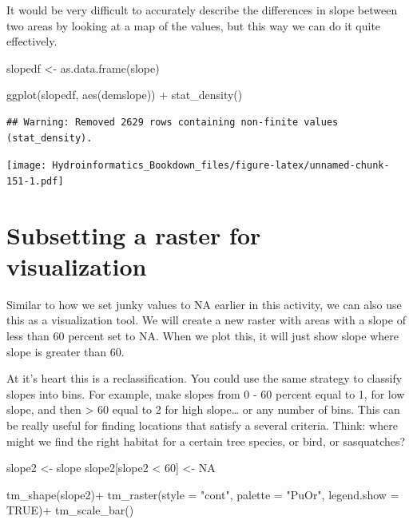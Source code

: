 \documentclass[
]{book}
\newenvironment{Shaded}{\begin{snugshade}}{\end{snugshade}}
\newcommand{\AttributeTok}[1]{\textcolor[rgb]{0.77,0.63,0.00}{#1}}
\newcommand{\ConstantTok}[1]{\textcolor[rgb]{0.00,0.00,0.00}{#1}}
\newcommand{\DecValTok}[1]{\textcolor[rgb]{0.00,0.00,0.81}{#1}}
\newcommand{\FunctionTok}[1]{\textcolor[rgb]{0.00,0.00,0.00}{#1}}
\newcommand{\NormalTok}[1]{#1}
\newcommand{\OtherTok}[1]{\textcolor[rgb]{0.56,0.35,0.01}{#1}}
\newcommand{\SpecialCharTok}[1]{\textcolor[rgb]{0.00,0.00,0.00}{#1}}
\newcommand{\StringTok}[1]{\textcolor[rgb]{0.31,0.60,0.02}{#1}}
\begin{document}
It would be very difficult to accurately describe the differences in slope between two areas by looking at a map of the values, but this way we can do it quite effectively.

\begin{Shaded}
\begin{Highlighting}[]
\NormalTok{slopedf }\OtherTok{\textless{}{-}} \FunctionTok{as.data.frame}\NormalTok{(slope)}

\FunctionTok{ggplot}\NormalTok{(slopedf, }\FunctionTok{aes}\NormalTok{(demslope)) }\SpecialCharTok{+}
  \FunctionTok{stat\_density}\NormalTok{()}
\end{Highlighting}
\end{Shaded}

\begin{verbatim}
## Warning: Removed 2629 rows containing non-finite values (stat_density).
\end{verbatim}

\texttt{[image: Hydroinformatics\_Bookdown\_files/figure-latex/unnamed-chunk-151-1.pdf]}

\hypertarget{subsetting-a-raster-for-visualization}{%
\section{Subsetting a raster for visualization}\label{subsetting-a-raster-for-visualization}}

Similar to how we set junky values to NA earlier in this activity, we can also use this as a visualization tool. We will create a new raster with areas with a slope of less than 60 percent set to NA. When we plot this, it will just show slope where slope is greater than 60.

At it's heart this is a reclassification. You could use the same strategy to classify slopes into bins. For example, make slopes from 0 - 60 percent equal to 1, for low slope, and then \textgreater{} 60 equal to 2 for high slope\ldots{} or any number of bins. This can be really useful for finding locations that satisfy a several criteria. Think: where might we find the right habitat for a certain tree species, or bird, or sasquatches?

\begin{Shaded}
\begin{Highlighting}[]
\NormalTok{slope2 }\OtherTok{\textless{}{-}}\NormalTok{ slope}
\NormalTok{slope2[slope2 }\SpecialCharTok{\textless{}} \DecValTok{60}\NormalTok{] }\OtherTok{\textless{}{-}} \ConstantTok{NA}

\FunctionTok{tm\_shape}\NormalTok{(slope2)}\SpecialCharTok{+}
  \FunctionTok{tm\_raster}\NormalTok{(}\AttributeTok{style =} \StringTok{"cont"}\NormalTok{, }\AttributeTok{palette =} \StringTok{"PuOr"}\NormalTok{, }\AttributeTok{legend.show =} \ConstantTok{TRUE}\NormalTok{)}\SpecialCharTok{+}
  \FunctionTok{tm\_scale\_bar}\NormalTok{()}
\end{Highlighting}
\end{Shaded}
\end{document}
